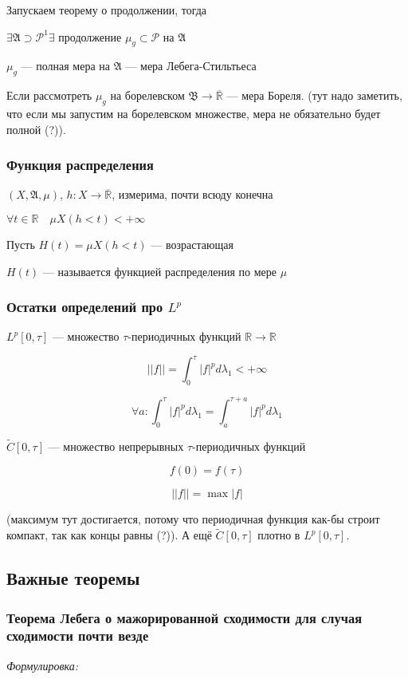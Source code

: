 \documentclass{article}
\def\rinf{\overline{\mathbb{R}}}
\begin{document}
Запускаем теорему о продолжении, тогда

$\exists \mathfrak{A} \supset \mathcal{P}^{1} \exists$ продолжение $\mu_g \subset \mathcal{P}$ на $\mathfrak{A}$

$\mu_g$ --- полная мера на $\mathfrak{A}$ --- мера Лебега-Стильтьеса

Если рассмотреть $\mu_g$ на борелевском $\mathfrak{B} \rightarrow \rinf$ --- мера Бореля. (тут надо заметить, что если мы запустим на борелевском множестве, мера не обязательно будет полной (?)).


\subsubsection{Функция распределения}
$(X, \mathfrak{A}, \mu)$, $h: X \rightarrow \rinf$, измерима, почти всюду конечна

$\forall t \in \mathbb{R} \quad \mu X(h < t) < +\infty$

Пусть $H(t) = \mu X(h < t)$ --- возрастающая

$H(t)$ --- называется функцией распределения по мере $\mu$

\subsubsection{Остатки определений про $L^p$}

$L^p[0, \tau]$ --- множество $\tau$-периодичных функций $\mathbb{R} \rightarrow \mathbb{R}$

\[||f|| = \int_0^{\tau} |f|^p d\lambda_1 < +\infty\]

\[\forall a : \int_0^{\tau} |f|^p d\lambda_1 = \int_a^{\tau + a} |f|^p d\lambda_1\]

$\tilde{C}[0, \tau]$ --- множество непрерывных $\tau$-периодичных функций

\[f(0) = f(\tau)\]

\[||f|| = \max{|f|}\]

(максимум тут достигается, потому что периодичная функция как-бы строит компакт, так как концы равны (?)). А ещё $\tilde{C}[0, \tau]$ плотно в $L^p[0, \tau]$.

\newpage

\subsection{Важные теоремы}

\subsubsection{Теорема Лебега о мажорированной сходимости для случая сходимости почти везде}
\textit{Формулировка:}
\end{document}
